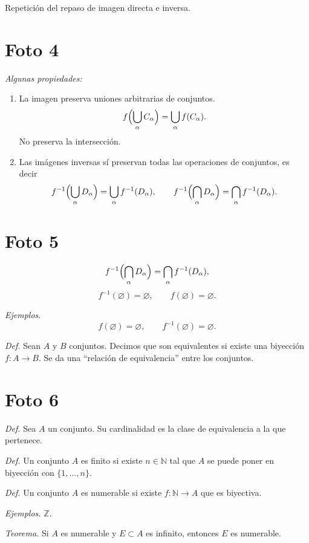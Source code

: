 \documentclass[12pt]{article}
\begin{document}
Repetici\'on del repaso de imagen directa e inversa.

\section*{Foto 4}

\textit{Algunas propiedades:}

\begin{enumerate}[label=\arabic*.]
    \item La imagen preserva uniones arbitrarias de conjuntos.
    \[
    f\Bigl(\bigcup_\alpha C_\alpha\Bigr)=\bigcup_\alpha f(C_\alpha).
    \]
    No preserva la intersecci\'on.
    \item Las im\'agenes inversas s\'i preservan todas las operaciones de conjuntos, es decir
    \[
    f^{-1}\Bigl(\bigcup_\alpha D_\alpha\Bigr)=\bigcup_\alpha f^{-1}(D_\alpha),
    \qquad
    f^{-1}\Bigl(\bigcap_\alpha D_\alpha\Bigr)=\bigcap_\alpha f^{-1}(D_\alpha).
    \]
\end{enumerate}

\section*{Foto 5}

\[
f^{-1}\Bigl(\bigcap_\alpha D_\alpha\Bigr)=\bigcap_\alpha f^{-1}(D_\alpha),
\]
\[
f^{-1}(\varnothing)=\varnothing,\qquad f(\varnothing)=\varnothing.
\]

\textit{Ejemplos.}
\[
f(\varnothing)=\varnothing,\qquad f^{-1}(\varnothing)=\varnothing.
\]

\textit{Def.}
Sean $A$ y $B$ conjuntos.
Decimos que son equivalentes si existe una biyecci\'on $f\colon A\to B$.
Se da una ``relaci\'on de equivalencia'' entre los conjuntos.

\section*{Foto 6}

\textit{Def.}
Sea $A$ un conjunto. Su cardinalidad es la clase de equivalencia a la que pertenece.

\textit{Def.}
Un conjunto $A$ es finito si existe $n\in\mathbb N$ tal que $A$ se puede poner en biyecci\'on con $\{1,\dots,n\}$.

\textit{Def.}
Un conjunto $A$ es numerable si existe $f\colon\mathbb N\to A$ que es biyectiva.

\textit{Ejemplos.} $\mathbb Z$.

\textit{Teorema.}
Si $A$ es numerable y $E\subset A$ es infinito, entonces $E$ es numerable.
\end{document}
